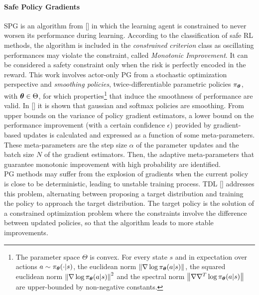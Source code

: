 \paragraph{Safe Policy Gradients} \label{subsec:safepg}
\acf{SPG} is an algorithm from [\cite{papini2019}] in which the learning agent is constrained to never worsen its performance during learning. According to the classification of safe \ac{RL} methods, the algorithm is included in the \emph{constrained criterion} class as oscillating performances may violate the constraint, called \emph{Monotonic Improvement}. It can be considered a safety constraint only when the risk is perfectly encoded in the reward. This work involves actor-only \ac{PG} from a stochastic optimization perspective and \emph{smoothing policies}, \ie twice-differentiable parametric policies $\pi_{\boldsymbol{\theta}}$, with $\boldsymbol{\theta} \in \Theta$, for which properties\footnote{The parameter space $\Theta$ is convex. For every state $s$ and in expectation over actions $a \sim \pi_{\boldsymbol{\theta}}(\cdot|s)$, the euclidean norm $\left\|\nabla \log \pi_{\boldsymbol{\theta}}(a|s)\right\|_{}$, the squared euclidean norm $\left\|\nabla \log \pi_{\boldsymbol{\theta}}(a|s)\right\|_{}^2$ and the spectral norm $\left\|\nabla\nabla^T \log \pi_{\boldsymbol{\theta}}(a|s)\right\|_{}$ are upper-bounded by non-negative constants.} that induce the smoothness of performance are valid. In [\cite{papini2019}] it is shown that gaussian and softmax policies are smoothing. From upper bounds on the variance of policy gradient estimators, a lower bound on the performance improvement (with a certain confidence $\epsilon$) provided by gradient-based updates is calculated and expressed as a function of some meta-parameters. These meta-parameters are the step size $\alpha$ of the parameter updates and the batch size $N$ of the gradient estimators. Then, the adaptive meta-parameters that guarantee monotonic improvement with high probability are identified.\\
\newline 
\ac{PG} methods may suffer from the explosion of gradients when the current policy is close to be deterministic, leading to unstable training process. \acf{TDL} [\cite{DBLP:journals/corr/abs-1905-11041}] addresses this problem, alternating between proposing a target distribution and training the policy to approach the target distribution. The target policy is the solution of a constrained optimization problem where the constraints involve the difference between updated policies, so that the algorithm leads to more stable improvements.